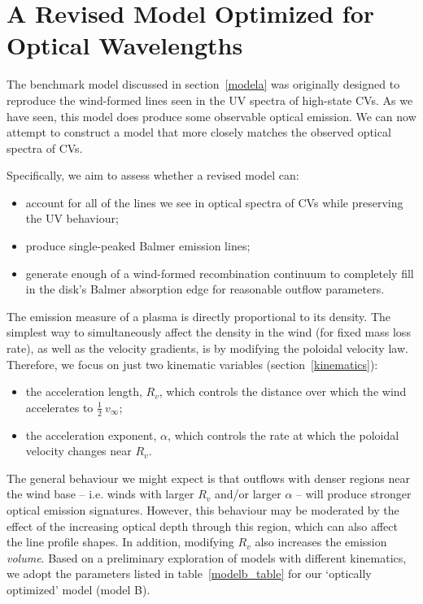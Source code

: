 \documentclass[preprint, a4paper, 11pt]{aastex}
\begin{document}
%
%

\section{A Revised Model Optimized for Optical Wavelengths}

The benchmark model discussed in section~\ref{modela} was originally
designed to reproduce the wind-formed lines seen in the UV spectra of
high-state CVs. As we have seen, this model does produce some observable
optical emission. We can now attempt to construct a model that more closely 
matches the observed optical spectra of CVs. 

Specifically, we aim to assess whether a revised model can:

\begin{itemize}
         \item account for all of the lines we see in optical spectra of CVs while preserving
the UV behaviour;
         \item produce single-peaked Balmer emission lines; 
         \item generate enough of a wind-formed recombination continuum
to completely fill in the disk's Balmer absorption edge for 
reasonable outflow parameters.
\end{itemize} 

The emission measure of a plasma is directly proportional to its density.
The simplest way to simultaneously affect the density in the wind (for fixed mass loss rate),
as well as the velocity gradients, is by modifying the poloidal velocity
law. Therefore, we focus on just two kinematic variables (section~\ref{kinematics}):

\begin{itemize}
         \item the acceleration length, $R_v$, which controls the
        distance over which the wind accelerates to $\frac{1}{2}~v_{\infty}$;
         \item the acceleration exponent, $\alpha$, which controls the rate 
         at which the poloidal velocity changes near $R_v$.
\end{itemize} 

The general behaviour we might expect is that outflows with denser
regions near the wind base -- i.e. winds with larger $R_{v}$ and/or
larger $\alpha$ -- will produce stronger optical emission signatures. 
However, this behaviour may be moderated by the effect of the increasing
optical depth through this region, which can also affect the line profile shapes. 
In addition, modifying $R_v$ also increases the emission {\em volume}.
Based on a preliminary exploration of models with different kinematics,
we adopt the parameters listed in table~\ref{modelb_table}
for our `optically optimized' model (model B). 
\end{document}
